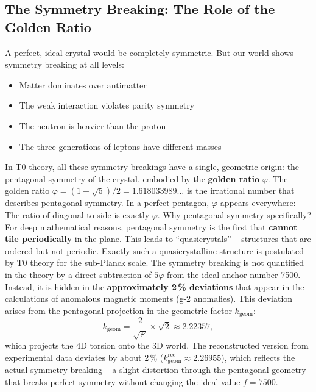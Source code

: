 	\subsection{The Symmetry Breaking: The Role of the Golden Ratio}
	A perfect, ideal crystal would be completely symmetric. But our world shows symmetry breaking at all levels:
	\begin{itemize}
		\item Matter dominates over antimatter
		\item The weak interaction violates parity symmetry
		\item The neutron is heavier than the proton
		\item The three generations of leptons have different masses
	\end{itemize}
	In T0 theory, all these symmetry breakings have a single, geometric origin: the pentagonal symmetry of the crystal, embodied by the \textbf{golden ratio} \(\varphi\).
	The golden ratio \(\varphi = (1+\sqrt{5})/2 = 1.618033989\ldots\) is the irrational number that describes pentagonal symmetry. In a perfect pentagon, \(\varphi\) appears everywhere: The ratio of diagonal to side is exactly \(\varphi\).
	Why pentagonal symmetry specifically? For deep mathematical reasons, pentagonal symmetry is the first that \textbf{cannot tile periodically} in the plane. This leads to \enquote{quasicrystals} -- structures that are ordered but not periodic. Exactly such a quasicrystalline structure is postulated by T0 theory for the sub-Planck scale.
	The symmetry breaking is not quantified in the theory by a direct subtraction of \(5\varphi\) from the ideal anchor number 7500. Instead, it is hidden in the \textbf{approximately 2\,\% deviations} that appear in the calculations of anomalous magnetic moments (g-2 anomalies). This deviation arises from the pentagonal projection in the geometric factor \(k_\text{geom}\):
	\begin{equation}
		k_\text{geom} = \frac{2}{\sqrt{\varphi}} \times \sqrt{2} \approx 2.22357,
	\end{equation}
	which projects the 4D torsion onto the 3D world. The reconstructed version from experimental data deviates by about 2\,\% (\(k_\text{geom}^\text{rec} \approx 2.26955\)), which reflects the actual symmetry breaking -- a slight distortion through the pentagonal geometry that breaks perfect symmetry without changing the ideal value \(f = 7500\).
